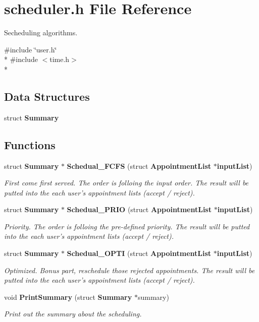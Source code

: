\section{scheduler.\+h File Reference}
\label{scheduler_8h}


Secheduling algorithms.  


{\ttfamily \#include \char`\"{}user.\+h\char`\"{}}\\*
{\ttfamily \#include $<$time.\+h$>$}\\*
\subsection*{Data Structures}
\begin{DoxyCompactItemize}
\item 
struct {\bf Summary}
\end{DoxyCompactItemize}
\subsection*{Functions}
\begin{DoxyCompactItemize}
\item 
struct {\bf Summary} $\ast$ {\bf Schedual\+\_\+\+F\+C\+F\+S} (struct {\bf Appointment\+List} $\ast${\bf input\+List})
\begin{DoxyCompactList}\small\item\em First come first served. The order is folloing the input order. The result will be putted into the each user's appointment lists (accept / reject). \end{DoxyCompactList}\item 
struct {\bf Summary} $\ast$ {\bf Schedual\+\_\+\+P\+R\+I\+O} (struct {\bf Appointment\+List} $\ast${\bf input\+List})
\begin{DoxyCompactList}\small\item\em Priority. The order is folloing the pre-\/defined priority. The result will be putted into the each user's appointment lists (accept / reject). \end{DoxyCompactList}\item 
struct {\bf Summary} $\ast$ {\bf Schedual\+\_\+\+O\+P\+T\+I} (struct {\bf Appointment\+List} $\ast${\bf input\+List})
\begin{DoxyCompactList}\small\item\em Optimized. Bonus part, reschedule those rejected appointments. The result will be putted into the each user's appointment lists (accept / reject). \end{DoxyCompactList}\item 
void {\bf Print\+Summary} (struct {\bf Summary} $\ast$summary)
\begin{DoxyCompactList}\small\item\em Print out the summary about the scheduling. \end{DoxyCompactList}\end{DoxyCompactItemize}


